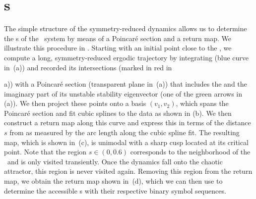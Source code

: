 \section{\Po s}
\label{s:numerics}

The simple structure of the symmetry-reduced dynamics allows us to
determine the \rpo s of the \twomode\ system by means of a Poincar\'e
section and a return map. We illustrate this procedure in
. Starting with an initial point close to the
\REQV{}{}, we compute a long, symmetry-reduced ergodic trajectory by integrating 
 (blue curve in
\,(a)) and recorded its intersections (marked
in red in \,{a)) with a Poincar\'e section
(transparent plane in \,(a)) that includes
the \REQV{}{} and the imaginary part of its unstable stability
eigenvector (one of the green arrows in (a)). 
We then project these points onto a basis $(v_1, v_2)$, which
spans the Poincar\'e section and fit cubic splines to the data as shown in (b). 
We then construct a return map along this curve and express this in terms of the distance $s$ from \REQV{}{}
as measured by the arc length along the cubic spline fit. The resulting map, which is shown in
\,(c), is unimodal with a sharp cusp located at its critical point. 
Note that the region $s \in (0, 0.6)$ corresponds to
the neighborhood of the \reqv\  and is only visited transiently. Once the dynamics fall onto the chaotic
attractor, this region is never visited again. Removing this region from the return map, we
obtain the return map shown in \,(d), which we can then use to determine the 
accessible \rpo s  with their respective binary symbol sequences.

}
